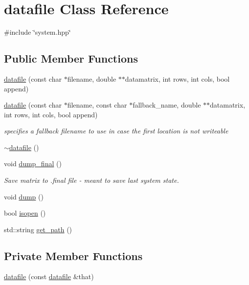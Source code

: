\hypertarget{classdatafile}{\section{datafile Class Reference}
\label{classdatafile}
}


{\ttfamily \#include \char`\"{}system.\-hpp\char`\"{}}

\subsection*{Public Member Functions}
\begin{DoxyCompactItemize}
\item 
\hyperlink{classdatafile_a16a2cd8a77f1faa65cfc4ff135f917c7}{datafile} (const char $\ast$filename, double $\ast$$\ast$datamatrix, int rows, int cols, bool append)
\item 
\hyperlink{classdatafile_aeaa064104b437b95d273dd699df2effb}{datafile} (const char $\ast$filename, const char $\ast$fallback\-\_\-name, double $\ast$$\ast$datamatrix, int rows, int cols, bool append)
\begin{DoxyCompactList}\small\item\em specifies a fallback filename to use in case the first location is not writeable \end{DoxyCompactList}\item 
\hyperlink{classdatafile_aedef6642e02a913ec9f38c359cdac4be}{$\sim$datafile} ()
\item 
void \hyperlink{classdatafile_a10e7dcf1beebe4f13b70aa4fd1ee421b}{dump\-\_\-final} ()
\begin{DoxyCompactList}\small\item\em Save matrix to .final file -\/ meant to save last system state. \end{DoxyCompactList}\item 
void \hyperlink{classdatafile_a0031c4995e788411b2434e6fbb8c7a67}{dump} ()
\item 
bool \hyperlink{classdatafile_aa112d6d47cd923d434c2e6efed9711e8}{isopen} ()
\item 
std\-::string \hyperlink{classdatafile_aa55618f25a485aeadf64accf91b21ca7}{get\-\_\-path} ()
\end{DoxyCompactItemize}
\subsection*{Private Member Functions}
\begin{DoxyCompactItemize}
\item 
\hyperlink{classdatafile_a0fecbbbf4ce07110cec5dec600c61d28}{datafile} (const \hyperlink{classdatafile}{datafile} \&that)
\end{DoxyCompactItemize}
